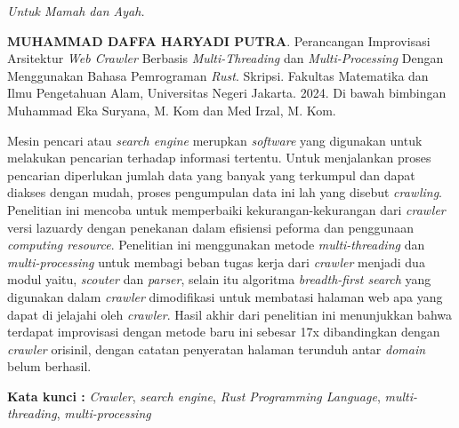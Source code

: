 \documentclass{jtetiskripsi}
\begin{document}
\cover

% 
% 
% 




\acknowledgment
\begin{flushright}
	\emph{Untuk Mamah dan Ayah.}
\end{flushright}



\begin{abstractind}
\textbf{MUHAMMAD DAFFA HARYADI PUTRA}. Perancangan Improvisasi Arsitektur \emph{Web Crawler} Berbasis \emph{Multi-Threading} dan \emph{Multi-Processing} Dengan Menggunakan Bahasa Pemrograman \emph{Rust}. Skripsi. Fakultas Matematika dan Ilmu Pengetahuan Alam, Universitas Negeri Jakarta. 2024. Di bawah bimbingan Muhammad Eka Suryana, M. Kom dan Med Irzal, M. Kom.
\vskip1cm
	
  Mesin pencari atau \emph{search engine} merupkan \emph{software} yang digunakan untuk melakukan pencarian terhadap informasi tertentu. Untuk menjalankan proses pencarian diperlukan jumlah data yang banyak yang terkumpul dan dapat diakses dengan mudah, proses pengumpulan data ini lah yang disebut \emph{crawling}. Penelitian ini mencoba untuk memperbaiki kekurangan-kekurangan dari \emph{crawler} versi lazuardy dengan penekanan dalam efisiensi peforma dan penggunaan \emph{computing resource}. Penelitian ini menggunakan metode \emph{multi-threading} dan \emph{multi-processing} untuk membagi beban tugas kerja dari \emph{crawler} menjadi dua modul yaitu, \emph{scouter} dan \emph{parser}, selain itu algoritma \emph{breadth-first search} yang digunakan dalam \emph{crawler} dimodifikasi untuk membatasi halaman web apa yang dapat di jelajahi oleh \emph{crawler}. Hasil akhir dari penelitian ini menunjukkan bahwa terdapat improvisasi dengan metode baru ini sebesar 17x dibandingkan dengan \emph{crawler} orisinil, dengan catatan penyeratan halaman terunduh antar \emph{domain} belum berhasil.
	
	\bigskip
	\noindent
  \textbf{Kata kunci :} \textit{Crawler}, \textit{search engine}, \textit{Rust Programming Language}, \textit{multi-threading}, \textit{multi-processing}
\end{abstractind}
\end{document}
